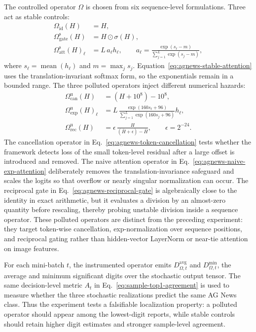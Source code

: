\documentclass[manuscript, screen]{acmart}
\begin{document}
The controlled operator $\Omega$ is chosen from six sequence-level
formulations. Three act as stable controls:
\begin{align}
\Omega_{\mathrm{id}}(H) &= H,
\label{eq:agnews-identity}\\
\Omega_{\mathrm{gate}}^{\mathrm{s}}(H)
&= H\odot \sigma(H),
\label{eq:agnews-smooth-gate}\\
\Omega_{\mathrm{att}}^{\mathrm{s}}(H)_{\ell}
&= L\,a_{\ell} h_{\ell}, \qquad
a_{\ell}
=
\frac{\exp(s_{\ell}-m)}
{\sum_{j=1}^{L}\exp(s_j-m)},
\label{eq:agnews-stable-attention}
\end{align}
where $s_{\ell}=\operatorname{mean}(h_{\ell})$ and
$m=\max_j s_j$. Equation~\eqref{eq:agnews-stable-attention} uses the
translation-invariant softmax form, so the exponentials remain in a bounded
range. The three polluted operators inject different numerical hazards:
\begin{align}
\Omega_{\mathrm{can}}^{\mathrm{u}}(H)
&=(H+10^8)-10^8,
\label{eq:agnews-token-cancellation}\\
\Omega_{\mathrm{exp}}^{\mathrm{u}}(H)_{\ell}
&=
L\,
\frac{\exp(160s_{\ell}+96)}
{\sum_{j=1}^{L}\exp(160s_j+96)}
h_{\ell},
\label{eq:agnews-naive-exp-attention}\\
\Omega_{\mathrm{rec}}^{\mathrm{u}}(H)
&=
\epsilon\,
\frac{H}{(\bar{H}+\epsilon)-\bar{H}},
\qquad
\epsilon=2^{-24}.
\label{eq:agnews-reciprocal-gate}
\end{align}
The cancellation operator in Eq.~\eqref{eq:agnews-token-cancellation} tests
whether the framework detects loss of the small token-level residual after a
large offset is introduced and removed. The naive attention operator in
Eq.~\eqref{eq:agnews-naive-exp-attention} deliberately removes the
translation-invariance safeguard and scales the logits so that overflow or
nearly singular normalization can occur. The reciprocal gate in
Eq.~\eqref{eq:agnews-reciprocal-gate} is algebraically close to the identity
in exact arithmetic, but it evaluates a division by an almost-zero quantity
before rescaling, thereby probing unstable division inside a sequence
operator. These polluted operators are distinct from the preceding experiment: they target token-wise cancellation, exp-normalization over sequence
positions, and reciprocal gating rather than hidden-vector LayerNorm or
near-tie attention on image features.

For each mini-batch $t$, the instrumented operator emits
$D_{\Omega,t}^{\mathrm{avg}}$ and $D_{\Omega,t}^{\min}$, the average and
minimum significant digits over the stochastic output tensor. The same
decision-level metric $A_t$ in Eq.~\eqref{eq:sample-top1-agreement} is used to
measure whether the three stochastic realizations predict the same AG News
class. Thus the experiment tests a falsifiable localization property: a
polluted operator should appear among the lowest-digit reports, while stable
controls should retain higher digit estimates and stronger sample-level
agreement.
\end{document}
